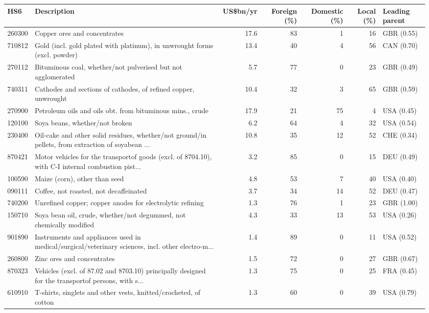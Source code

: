 \begin{tabular}{@{}l p{6.4cm} r r r r l@{}}
\toprule
HS6 & Description & US\$bn/yr & Foreign (\%) & Domestic (\%) & Local (\%) & Leading parent \\
\midrule
260300 & Copper ores and concentrates & 17.6 & 83 & 1 & 16 & GBR (0.55) \\
710812 & Gold (incl. gold plated with platinum), in unwrought forms (excl. powder) & 13.4 & 40 & 4 & 56 & CAN (0.70) \\
270112 & Bituminous coal, whether/\allowbreak{}not pulverised but not agglomerated & 5.7 & 77 & 0 & 23 & GBR (0.49) \\
740311 & Cathodes and sections of cathodes, of refined copper, unwrought & 10.4 & 32 & 3 & 65 & GBR (0.59) \\
270900 & Petroleum oils and oils obt. from bituminous mins., crude & 17.9 & 21 & 75 & 4 & USA (0.45) \\
120100 & Soya beans, whether/\allowbreak{}not broken & 6.2 & 64 & 4 & 32 & USA (0.54) \\
230400 & Oil-cake and other solid residues, whether/\allowbreak{}not ground/\allowbreak{}in pellets, from extraction of soyabean ... & 10.8 & 35 & 12 & 52 & CHE (0.34) \\
870421 & Motor vehicles for the transportof goods (excl. of 8704.10), with C-I internal combustion pist... & 3.2 & 85 & 0 & 15 & DEU (0.49) \\
100590 & Maize (corn), other than seed & 4.8 & 53 & 7 & 40 & USA (0.40) \\
090111 & Coffee, not roasted, not decaffeinated & 3.7 & 34 & 14 & 52 & DEU (0.47) \\
740200 & Unrefined copper; copper anodes for electrolytic refining & 1.3 & 76 & 1 & 23 & GBR (1.00) \\
150710 & Soya bean oil, crude, whether/\allowbreak{}not degummed, not chemically modified & 4.3 & 33 & 13 & 53 & USA (0.26) \\
901890 & Instruments and appliances used in medical/\allowbreak{}surgical/\allowbreak{}veterinary sciences, incl. other electro-m... & 1.4 & 89 & 0 & 11 & USA (0.52) \\
260800 & Zinc ores and concentrates & 1.5 & 72 & 0 & 27 & GBR (0.67) \\
870323 & Vehicles (excl. of 87.02 and 8703.10) principally designed for the transportof persons, with s... & 1.3 & 75 & 0 & 25 & FRA (0.45) \\
610910 & T-shirts, singlets and other vests, knitted/\allowbreak{}crocheted, of cotton & 1.3 & 60 & 0 & 39 & USA (0.79) \\

\end{tabular}
